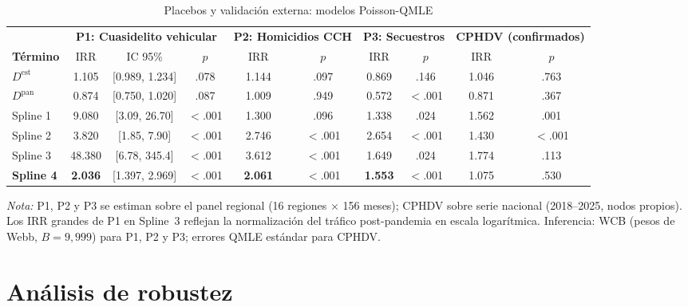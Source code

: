 \documentclass[12pt,a4paper]{article}
\newcommand{\tablenote}[1]{%
  \vspace{2pt}%
  \begin{minipage}{\linewidth}%
    \footnotesize\textit{Nota:} #1%
  \end{minipage}%
}
\begin{document}
\begin{table}[H]
\centering
\caption{Placebos y validaci\'on externa: modelos Poisson-QMLE}
\label{tab:placebos}
\footnotesize
\begin{adjustbox}{max width=\columnwidth}
\begin{tabular}{l@{\hskip 3mm}ccc@{\hskip 4mm}cc@{\hskip 4mm}cc@{\hskip 4mm}cc}
\toprule
 & \multicolumn{3}{c}{\textbf{P1: Cuasidelito vehicular}} & \multicolumn{2}{c}{\textbf{P2: Homicidios CCH}} & \multicolumn{2}{c}{\textbf{P3: Secuestros}} & \multicolumn{2}{c}{\textbf{CPHDV (confirmados)}} \\
\cmidrule(lr){2-4}\cmidrule(lr){5-6}\cmidrule(lr){7-8}\cmidrule(lr){9-10}
\textbf{T\'ermino} & IRR & IC 95\% & $p$ & IRR & $p$ & IRR & $p$ & IRR & $p$ \\
\midrule
$D^{\text{est}}$ & 1.105 & [0.989, 1.234] & .078 & 1.144 & .097 & 0.869 & .146 & 1.046 & .763 \\
$D^{\text{pan}}$ & 0.874 & [0.750, 1.020] & .087 & 1.009 & .949 & 0.572 & $<$.001 & 0.871 & .367 \\
\midrule
Spline 1 &  9.080 & [3.09, 26.70] & $<$.001 & 1.300 & .096 & 1.338 & .024 & 1.562 & .001 \\
Spline 2 &  3.820 & [1.85,  7.90] & $<$.001 & 2.746 & $<$.001 & 2.654 & $<$.001 & 1.430 & $<$.001 \\
Spline 3 & 48.380 & [6.78, 345.4] & $<$.001 & 3.612 & $<$.001 & 1.649 & .024 & 1.774 & .113 \\
\textbf{Spline 4} & \textbf{2.036} & [1.397, 2.969] & $<$.001 & \textbf{2.061} & $<$.001 & \textbf{1.553} & $<$.001 & 1.075 & .530 \\
\bottomrule
\end{tabular}
\end{adjustbox}
\tablenote{P1, P2 y P3 se estiman sobre el panel regional (16 regiones $\times$ 156 meses);
CPHDV sobre serie nacional (2018--2025, nodos propios). Los IRR grandes de P1 en
Spline~3 reflejan la normalizaci\'on del tr\'afico post-pandemia en escala logar\'itmica.
Inferencia: WCB (pesos de Webb, $B=9{,}999$) para P1, P2 y P3; errores QMLE est\'andar
para CPHDV.}
\end{table}




\section{An\'alisis de robustez}
\label{sec:robustez}
\end{document}
